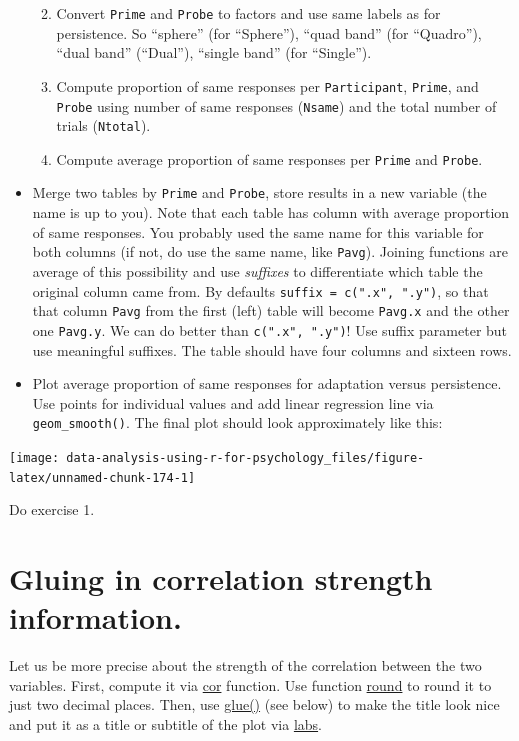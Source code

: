 \documentclass[
]{book}
\providecommand{\tightlist}{%
  \setlength{\itemsep}{0pt}\setlength{\parskip}{0pt}}
\begin{document}
\begin{itemize}
  \begin{enumerate}
  \def\labelenumi{\arabic{enumi}.}
  \tightlist
  \item
    Convert \texttt{Prime} and \texttt{Probe} to factors and use same labels as for persistence. So ``sphere'' (for ``Sphere''), ``quad band'' (for ``Quadro''), ``dual band'' (``Dual''), ``single band'' (for ``Single'').
  \item
    Compute proportion of same responses per \texttt{Participant}, \texttt{Prime}, and \texttt{Probe} using number of same responses (\texttt{Nsame}) and the total number of trials (\texttt{Ntotal}).
  \item
    Compute average proportion of same responses per \texttt{Prime} and \texttt{Probe}.
  \end{enumerate}
\item
  Merge two tables by \texttt{Prime} and \texttt{Probe}, store results in a new variable (the name is up to you). Note that each table has column with average proportion of same responses. You probably used the same name for this variable for both columns (if not, do use the same name, like \texttt{Pavg}). Joining functions are average of this possibility and use \emph{suffixes} to differentiate which table the original column came from. By defaults \texttt{suffix\ =\ c(".x",\ ".y")}, so that that column \texttt{Pavg} from the first (left) table will become \texttt{Pavg.x} and the other one \texttt{Pavg.y}. We can do better than \texttt{c(".x",\ ".y")}! Use suffix parameter but use meaningful suffixes. The table should have four columns and sixteen rows.
\item
  Plot average proportion of same responses for adaptation versus persistence. Use points for individual values and add linear regression line via \texttt{geom\_smooth()}. The final plot should look approximately like this:
\end{itemize}

\begin{center}\texttt{[image: data-analysis-using-r-for-psychology\_files/figure-latex/unnamed-chunk-174-1]} \end{center}

Do exercise 1.

\hypertarget{glue}{%
\section{Gluing in correlation strength information.}\label{glue}}

Let us be more precise about the strength of the correlation between the two variables. First, compute it via \href{https://stat.ethz.ch/R-manual/R-patched/library/stats/html/cor.html}{cor} function. Use function \href{https://stat.ethz.ch/R-manual/R-patched/library/base/html/Round.html}{round} to round it to just two decimal places. Then, use \href{https://glue.tidyverse.org/}{glue()} (see below) to make the title look nice and put it as a title or subtitle of the plot via \href{https://ggplot2.tidyverse.org/reference/labs.html}{labs}.
\end{document}
